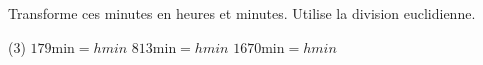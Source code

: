 %
%
Transforme ces minutes en heures et minutes. Utilise la division euclidienne.

    \begin{tasks} (3)
        \task $179 \text{min} =  h  min$
        \task $813 \text{min} = h  min$
        \task $1670 \text{min} = h  min$
    \end{tasks}

